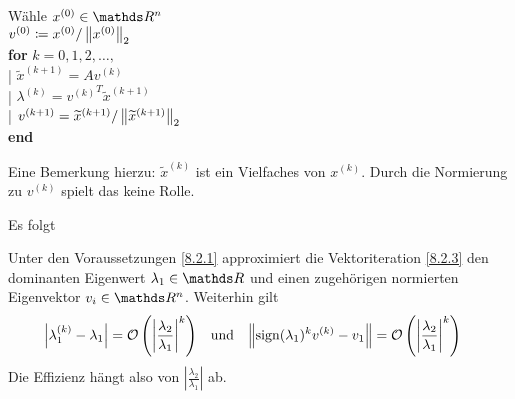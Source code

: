 \label{8.2.3}
\begin{pseudocode}{0.5\linewidth}
  Wähle $x^{(0)}\in\R^n$ \\
  $v^{(0)}\coloneqq x^{(0)}/\nn[x^{(0)}]_2$ \\
  \textbf{for} $k=0,1,2,\dotsc, $ \\
  |\> $\widetilde{x}^{(k+1)}= Av^{(k)}$ \\
  |\> $\lambda^{(k)} = {v^{(k)}}^T\widetilde{x}^{(k+1)}$ \\
  |\> $v^{(k+1)} = \widetilde{x}^{(k+1)}/\nn[\widetilde{x}^{(k+1)}]_2$
  \\
  \textbf{end}
\end{pseudocode}

Eine Bemerkung hierzu:
$\widetilde{x}^{(k)}$ ist ein Vielfaches von $x^{(k)}$.
Durch die Normierung zu $v^{(k)}$ spielt das keine Rolle.

Es folgt

\begin{Satze}\label{8.2.4}
  Unter den Voraussetzungen \ref{8.2.1} approximiert
  die Vektoriteration \ref{8.2.3} den dominanten Eigenwert
  $\lambda_1\in\R$ und einen zugehörigen 
  normierten Eigenvektor $v_i\in\R^n$.
  Weiterhin gilt
  \begin{align*}
    \left| \lambda_1^{(k)}-\lambda_1\right|
    &=\mathcal{O}\left(\left|
        \frac{\lambda_2}{\lambda_1}
      \right|^k\right)
    &\text{und}&
    &\nn[\Sign(\lambda_1)^k v^{(k)}-v_1]
    &=\mathcal{O}\left( \left|
        \frac{\lambda_2}{\lambda_1}
      \right|^k \right)
  \end{align*}
  Die Effizienz hängt also von 
  $\left|\frac{\lambda_2}{\lambda_1}\right|$ ab.
\end{Satze}

